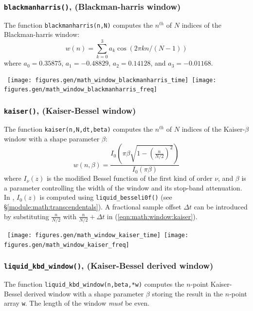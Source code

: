 \subsubsection{{\tt blackmanharris()}, (Blackman-harris window)}
\label{module:math:window:blackmanharris}
The function {\tt blackmanharris(n,N)} computes the $n^{th}$ of $N$
indices of the Blackman-harris window:
%
\begin{equation}
\label{eqn:math:window:blackmanharris}
    w(n) = \sum_{k=0}^{3} { a_k \cos\left( 2 \pi k n / (N-1)\right) }
\end{equation}
%
where
$a_0 =  0.35875$,
$a_1 = -0.48829$,
$a_2 =  0.14128$, and
$a_3 = -0.01168$.

%
% 
\mbox{
  \centering
  \texttt{[image: figures.gen/math\_window\_blackmanharris\_time]}
  \quad
  \texttt{[image: figures.gen/math\_window\_blackmanharris\_freq]}
}
%

\subsubsection{{\tt kaiser()}, (Kaiser-Bessel window)}
\label{module:math:window:kaiser}
The function {\tt kaiser(n,N,dt,beta)} computes the $n^{th}$ of $N$
indices of the Kaiser-$\beta$ window with a shape parameter $\beta$:
%
\begin{equation}
\label{eqn:math:window:kaiser}
    w(n,\beta) = \frac{
        I_0\left(\pi\beta\sqrt{1-\left(\frac{n}{N/2}\right)^2}\right)
    }{
        I_0\left(\pi\beta\right)
    }
\end{equation}
%
where $I_\nu(z)$ is the modified Bessel function of the first kind of
order $\nu$, and $\beta$ is a parameter controlling the width of the
window and its stop-band attenuation.
In \liquid, $I_0(z)$ is computed using {\tt liquid\_besseli0f()}
(see \S\ref{module:math:transcendentals}).
A fractional sample offset $\Delta t$ can be introduced by substituting
$\frac{n}{N/2}$ with
$\frac{n}{N/2} + \Delta t$ in (\ref{eqn:math:window:kaiser}).

%
% 
\mbox{
  \centering
  \texttt{[image: figures.gen/math\_window\_kaiser\_time]}
  \quad
  \texttt{[image: figures.gen/math\_window\_kaiser\_freq]}
}
%

\subsubsection{{\tt liquid\_kbd\_window()}, (Kaiser-Bessel derived window)}
\label{module:math:window:kbd}
The function {\tt liquid\_kbd\_window(n,beta,*w)}
computes the $n$-point Kaiser-Bessel derived window with a shape
parameter $\beta$ storing the result in the $n$-point array {\tt w}.
The length of the window {\em must} be even.

